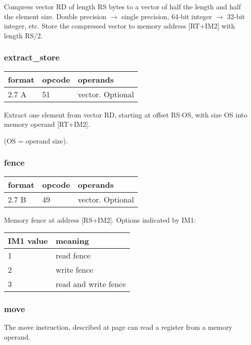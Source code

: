 \documentclass[forwardcom.tex]{subfiles}
\begin{document}
Compress vector RD of length RS bytes to a vector of half the length and half the element size.
Double precision $\rightarrow$ single precision, 64-bit integer
$\rightarrow$ 32-bit integer, etc. Store the compressed vector to memory address [RT+IM2] with length RS/2.

\subsubsection{extract\_store}
\label{table:extractStoreInstruction}
\begin{tabular}{|p{12mm}|p{12mm}|p{110mm}|}
\hline
\bfseries format & \bfseries opcode & \bfseries operands \\ \hline
2.7 A & 51 & vector. Optional \\ \hline
\end{tabular}
\vspace{2mm}

Extract one element from vector RD, starting at offset RS$\cdot$OS, with size OS into memory operand [RT+IM2].

(OS = operand size).


\subsubsection{fence}
\label{table:fenceInstruction}
\begin{tabular}{|p{12mm}|p{12mm}|p{110mm}|}
\hline
\bfseries format & \bfseries opcode & \bfseries operands \\ \hline
2.7 B & 49 & vector. Optional \\ \hline
\end{tabular}
\vspace{2mm}

Memory fence at address [RS+IM2]. Options indicated by IM1:
\vspace{2mm}

\begin{longtable}{|p{20mm}|p{50mm}|}
\endfirsthead
\endhead
\hline
\bfseries IM1 value & \bfseries meaning \\ \hline
1 & read fence \\ \hline
2 & write fence \\ \hline
3 & read and write fence \\ \hline
\end{longtable}
\vspace{2mm}

\subsubsection{move}
The move instruction, described at page \pageref{table:moveInstruction}
can read a register from a memory operand.
\end{document}
